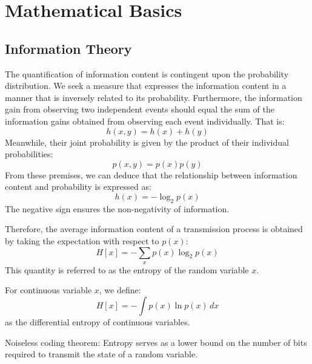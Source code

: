 \documentclass[../main.tex]{subfiles}
\begin{document}
\section{Mathematical Basics}
\subsection{Information Theory}

The quantification of information content is contingent upon the probability distribution. We seek a measure that expresses the information content in a manner that is inversely related to its probability.
Furthermore, the information gain from observing two independent events should equal the sum of the information gains obtained from observing each event individually. That is:
$$
h(x,y)=h(x) + h(y)
$$
Meanwhile, their joint probability is given by the product of their individual probabilities:
$$
p(x,y)=p(x)p(y)
$$
From these premises, we can deduce that the relationship between information content and probability is expressed as:
$$
h(x)=-\log_2p(x)
$$
The negative sign ensures the non-negativity of information.

\begin{purple}
\begin{definition}
    
Therefore, the average information content of a transmission process is obtained by taking the expectation with respect to $p(x)$:
$$
H[x]=-\sum_xp(x)\log_2p(x)
$$
This quantity is referred to as the entropy of the random variable $x$.

For continuous variable $x$, we define:
$$
H[x]=-\int p(x)\ln p(x)\,dx
$$
as the differential entropy of continuous variables.

\end{definition}
\end{purple}

\begin{yellow}
\begin{theorem}
Noiseless coding theorem: 
Entropy serves as a lower bound on the number of bits required to transmit the state of a random variable.
\end{theorem}
\end{yellow}
\end{document}
